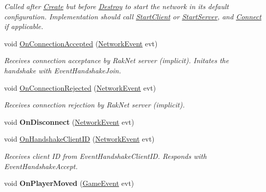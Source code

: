 \begin{DoxyCompactItemize}
\begin{DoxyCompactList}\small\item\em Called after \hyperlink{class_skyrates_1_1_common_1_1_network_1_1_network_common_a575172eb9f965e181e19649bcce38ca0}{Create} but before \hyperlink{class_skyrates_1_1_common_1_1_network_1_1_network_common_aa00266a16aa27dfd0eb242c74856a92a}{Destroy} to start the network in its default configuration. Implementation should call \hyperlink{class_skyrates_1_1_common_1_1_network_1_1_network_common_a982b732d621ff3f8738319053af8d154}{Start\-Client} or \hyperlink{class_skyrates_1_1_common_1_1_network_1_1_network_common_ac1209cf3fc31d2f145678971472ec20c}{Start\-Server}, and \hyperlink{class_skyrates_1_1_common_1_1_network_1_1_network_common_aa11961a4a6dc22c782552eb96e27c6e1}{Connect} if applicable.  \end{DoxyCompactList}\item 
void \hyperlink{class_skyrates_1_1_client_1_1_network_1_1_client_a8e264c8e627eace760e2a110b2b39a69}{On\-Connection\-Accepted} (\hyperlink{class_skyrates_1_1_common_1_1_network_1_1_event_1_1_network_event}{Network\-Event} evt)
\begin{DoxyCompactList}\small\item\em Receives connection acceptance by Rak\-Net server (implicit). Initates the handshake with Event\-Handshake\-Join. \end{DoxyCompactList}\item 
void \hyperlink{class_skyrates_1_1_client_1_1_network_1_1_client_ac010eecabdf4397ad93d9cae5ea60445}{On\-Connection\-Rejected} (\hyperlink{class_skyrates_1_1_common_1_1_network_1_1_event_1_1_network_event}{Network\-Event} evt)
\begin{DoxyCompactList}\small\item\em Receives connection rejection by Rak\-Net server (implicit). \end{DoxyCompactList}\item 
\hypertarget{class_skyrates_1_1_client_1_1_network_1_1_client_a55896d8aa53f613e8b12aa20f5ae8480}{void {\bfseries On\-Disconnect} (\hyperlink{class_skyrates_1_1_common_1_1_network_1_1_event_1_1_network_event}{Network\-Event} evt)}\label{class_skyrates_1_1_client_1_1_network_1_1_client_a55896d8aa53f613e8b12aa20f5ae8480}

\item 
void \hyperlink{class_skyrates_1_1_client_1_1_network_1_1_client_a8ef146c33d3ed104d0f937896964d4b2}{On\-Handshake\-Client\-I\-D} (\hyperlink{class_skyrates_1_1_common_1_1_network_1_1_event_1_1_network_event}{Network\-Event} evt)
\begin{DoxyCompactList}\small\item\em Receives client I\-D from Event\-Handshake\-Client\-I\-D. Responds with Event\-Handshake\-Accept. \end{DoxyCompactList}\item 
\hypertarget{class_skyrates_1_1_client_1_1_network_1_1_client_acd9aff235088112fb7789ba5ada41ccf}{void {\bfseries On\-Player\-Moved} (\hyperlink{class_skyrates_1_1_client_1_1_game_1_1_event_1_1_game_event}{Game\-Event} evt)}\label{class_skyrates_1_1_client_1_1_network_1_1_client_acd9aff235088112fb7789ba5ada41ccf}


\end{DoxyCompactItemize}
